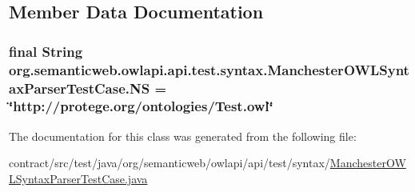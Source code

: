 \subsection{Member Data Documentation}
\hypertarget{classorg_1_1semanticweb_1_1owlapi_1_1api_1_1test_1_1syntax_1_1_manchester_o_w_l_syntax_parser_test_case_a7fbf47a4dcb9c7399b212db176d400fe}{
\subsubsection[{N\-S}]{\setlength{\rightskip}{0pt plus 5cm}final String org.\-semanticweb.\-owlapi.\-api.\-test.\-syntax.\-Manchester\-O\-W\-L\-Syntax\-Parser\-Test\-Case.\-N\-S = \char`\"{}http\-://protege.\-org/ontologies/Test.\-owl\char`\"{}\hspace{0.3cm}{\ttfamily [static]}}}\label{classorg_1_1semanticweb_1_1owlapi_1_1api_1_1test_1_1syntax_1_1_manchester_o_w_l_syntax_parser_test_case_a7fbf47a4dcb9c7399b212db176d400fe}


The documentation for this class was generated from the following file\-:\begin{DoxyCompactItemize}
\item 
contract/src/test/java/org/semanticweb/owlapi/api/test/syntax/\hyperlink{_manchester_o_w_l_syntax_parser_test_case_8java}{Manchester\-O\-W\-L\-Syntax\-Parser\-Test\-Case.\-java}\end{DoxyCompactItemize}
